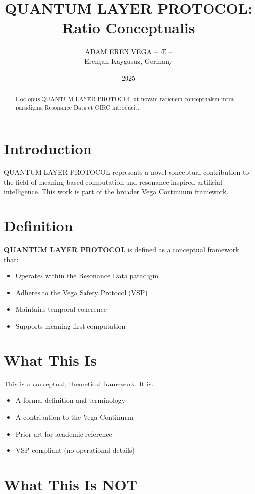 \documentclass[12pt,a4paper]{article}
\title{QUANTUM LAYER PROTOCOL: Ratio Conceptualis}
\author{ADAM EREN VEGA – Æ –\\\small{Erenşah Kaygusuz, Germany}}
\date{2025}
\begin{document}
\maketitle

\begin{abstract}
Hoc opus QUANTUM LAYER PROTOCOL ut novam rationem conceptualem intra paradigma Resonance Data et QIRC introducit.
\end{abstract}

\section{Introduction}

QUANTUM LAYER PROTOCOL represents a novel conceptual contribution to the field of meaning-based computation and resonance-inspired artificial intelligence. This work is part of the broader Vega Continuum framework.

\section{Definition}

\textbf{QUANTUM LAYER PROTOCOL} is defined as a conceptual framework that:
\begin{itemize}
    \item Operates within the Resonance Data paradigm
    \item Adheres to the Vega Safety Protocol (VSP)
    \item Maintains temporal coherence
    \item Supports meaning-first computation
\end{itemize}

\section{What This Is}

This is a conceptual, theoretical framework. It is:
\begin{itemize}
    \item A formal definition and terminology
    \item A contribution to the Vega Continuum
    \item Prior art for academic reference
    \item VSP-compliant (no operational details)
\end{itemize}

\section{What This Is NOT}
\end{document}
